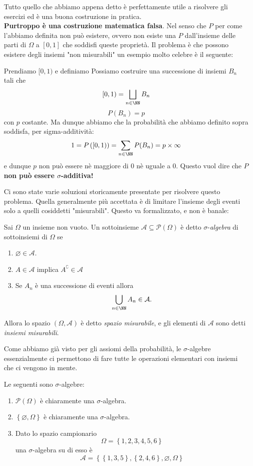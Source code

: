 \documentclass[11pt]{scrartcl}
\newcommand{\parti}[1]{\mathcal{P}\!\left(#1\right)}
\newcommand{\eset}{\varnothing}
\begin{document}
	Tutto quello che abbiamo appena detto è perfettamente utile a risolvere gli esercizi ed è una buona costruzione in pratica. \\
	\textbf{Purtroppo è una costruzione matematica falsa}. Nel senso che $P$ per come l'abbiamo definita non può esistere, ovvero non esiste una $P$ dall'insieme delle parti di $\Omega$ a $[0,1]$ che soddisfi queste proprietà. Il problema è che possono esistere degli insiemi "non misurabili" un esempio molto celebre è il seguente:
	\begin{example}
		Prendiamo $[0,1)$ e definiamo
		Possiamo costruire una successione di insiemi $B_n$ tali che
		$$[0,1)=\bigsqcup_{n\in\NN}B_n$$
		$$P(B_n)=p$$
		con $p$ costante. Ma dunque abbiamo che la probabilità che abbiamo definito sopra soddisfa, per sigma-additività:
		$$1=P\left([0,1)\right)=\sum_{n\in\NN}P(B_n)=p\times\infty$$
		e dunque $p$ non può essere nè maggiore di $0$ nè uguale a $0$. Questo vuol dire che $P$ \textbf{non può essere $\sigma$-additiva!} 
	\end{example}
	Ci sono state varie soluzioni storicamente presentate per risolvere questo problema. Quella generalmente più accettata è di limitare l'insieme degli eventi solo a quelli cosiddetti "misurabili". Questo va formalizzato, e non è banale:
	\begin{definition}
		Sai $\Omega$ un insieme non vuoto. Un sottoinsieme $\mathcal{A}\subseteq \parti{\Omega}$ è detto $\sigma$-\textit{algebra} di sottoinsiemi di $\Omega$ se
		\begin{enumerate}
			\item  $\eset\in \mathcal{A}$.
			\item  $A\in \mathcal{A}$ implica $A^\complement\in \mathcal{A}$
			\item Se $A_n$ è una successione di eventi allora 
			$$\bigcup_{n\in\NN}A_n\in \mathcal{A}.$$
		\end{enumerate}
		Allora lo spazio $(\Omega,\mathcal{A})$ è detto \textit{spazio misurabile}, e gli elementi di $\mathcal{A}$ sono detti \textit{insiemi misurabili}.
	\end{definition}
	Come abbiamo già visto per gli assiomi della probabilità, le $\sigma$-algebre essenzialmente ci permettono di fare tutte le operazioni elementari con insiemi che ci vengono in mente.
	\begin{example}
		Le seguenti sono $\sigma$-algebre:
		\begin{enumerate}
			\item $\parti{\Omega}$ è chiaramente una $\sigma$-algebra.
			\item $\left\{\eset,\Omega\right\}$ è chiaramente una $\sigma$-algebra.
			\item Dato lo spazio campionario
			$$\Omega=\left\{1,2,3,4,5,6\right\}$$
			una $\sigma$-algebra su di esso è
			$$\mathcal{A}=\left\{\left\{1,3,5\right\},\left\{2,4,6\right\},\eset,\Omega\right\}$$
		\end{enumerate}
	\end{example}
	
\end{document}
